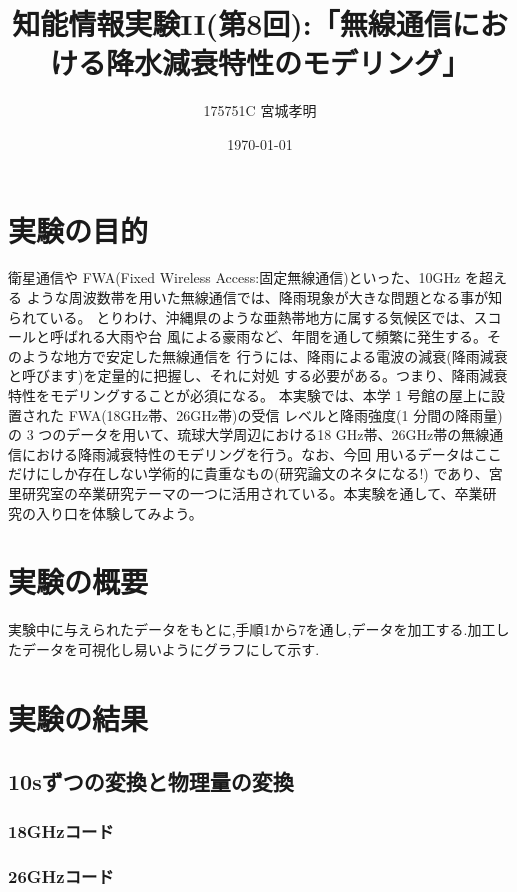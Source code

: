 \documentclass[a4paper,11pt,titlepage]{jarticle}
\title{知能情報実験II(第8回):「無線通信における降水減衰特性のモデリング」}
\author{175751C 宮城孝明}
\date{\today}
\begin{document}
\maketitle
\tableofcontents
\clearpage

\section{実験の目的}

衛星通信や FWA(Fixed Wireless Access:固定無線通信)といった、10GHz を超える ような周波数帯を用いた無線通信では、降雨現象が大きな問題となる事が知られている。 とりわけ、沖縄県のような亜熱帯地方に属する気候区では、スコールと呼ばれる大雨や台 風による豪雨など、年間を通して頻繁に発生する。そのような地方で安定した無線通信を 行うには、降雨による電波の減衰(降雨減衰と呼びます)を定量的に把握し、それに対処 する必要がある。つまり、降雨減衰特性をモデリングすることが必須になる。 本実験では、本学 1 号館の屋上に設置された FWA(18GHz帯、26GHz帯)の受信 レベルと降雨強度(1 分間の降雨量)の 3 つのデータを用いて、琉球大学周辺における18 GHz帯、26GHz帯の無線通信における降雨減衰特性のモデリングを行う。なお、今回 用いるデータはここだけにしか存在しない学術的に貴重なもの(研究論文のネタになる!) であり、宮里研究室の卒業研究テーマの一つに活用されている。本実験を通して、卒業研 究の入り口を体験してみよう。
\section{実験の概要}
実験中に与えられたデータをもとに,手順1から7を通し,データを加工する.加工したデータを可視化し易いようにグラフにして示す.

\section{実験の結果}

\subsection{10sずつの変換と物理量の変換}
\subsubsection{18GHzコード}


\subsubsection{26GHzコード}

\end{document}
